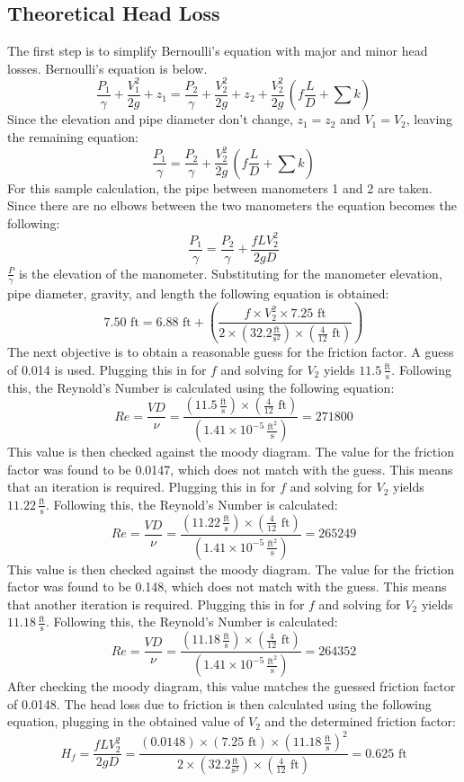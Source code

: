 \documentclass{article}
\begin{document}
\subsection{Theoretical Head Loss}
\noindent The first step is to simplify Bernoulli's equation with major and minor head losses. Bernoulli's equation is below. 
\[\frac{P_1}{\gamma}+\frac{V_1^2}{2g}+z_1=\frac{P_2}{\gamma}+\frac{V_2^2}{2g}+z_2+\frac{V_2^2}{2g}\,\left(f\frac{L}{D}+\sum k \right)\]
Since the elevation and pipe diameter don't change, \(z_1=z_2\) and \(V_1=V_2\), leaving the remaining equation: 
\[\frac{P_1}{\gamma}=\frac{P_2}{\gamma}+\frac{V_2^2}{2g}\,\left(f\frac{L}{D}+\sum k \right)\]
For this sample calculation, the pipe between manometers 1 and 2 are taken. Since there are no elbows between the two manometers the equation becomes the following: 
\[\frac{P_1}{\gamma}=\frac{P_2}{\gamma}+\frac{fLV_2^2}{2gD}\]
\(\frac{P}{\gamma}\) is the elevation of the manometer. Substituting for the manometer elevation, pipe diameter, gravity, and length the following equation is obtained: 
\[7.50\text{ ft}=6.88\text{ ft}+\left(\frac{f\times V_2^2\times7.25\text{ ft}}{2\times \left(32.2 \frac{\text{ft}}{\text{s}^2}\right)\times \left(\frac{4}{12}\text{ ft}\right)}\right)\]
The next objective is to obtain a reasonable guess for the friction factor. A guess of 0.014 is used. Plugging this in for $f$ and solving for $V_2$ yields $11.5\,\frac{\text{ft}}{\text{s}}$. Following this, the Reynold's Number is calculated using the following equation: 
\[Re=\frac{VD}{\nu}=\frac{\left(11.5\,\frac{\text{ft}}{\text{s}}\right)\times \left(\frac{4}{12}\text{ ft}\right)}{\left(1.41\times10^{-5}\,\frac{\text{ft}^2}{\text{s}}\right)}=271800\]
This value is then checked against the moody diagram. The value for the friction factor was found to be 0.0147, which does not match with the guess. This means that an iteration is required. Plugging this in for $f$ and solving for $V_2$ yields $11.22\,\frac{\text{ft}}{\text{s}}$. Following this, the Reynold's Number is calculated: 
\[Re=\frac{VD}{\nu}=\frac{\left(11.22\,\frac{\text{ft}}{\text{s}}\right)\times \left(\frac{4}{12}\text{ ft}\right)}{\left(1.41\times10^{-5}\,\frac{\text{ft}^2}{\text{s}}\right)}=265249\]
This value is then checked against the moody diagram. The value for the friction factor was found to be 0.148, which does not match with the guess. This means that another iteration is required. Plugging this in for $f$ and solving for $V_2$ yields $11.18\,\frac{\text{ft}}{\text{s}}$. Following this, the Reynold's Number is calculated: 
\[Re=\frac{VD}{\nu}=\frac{\left(11.18\,\frac{\text{ft}}{\text{s}}\right)\times \left(\frac{4}{12}\text{ ft}\right)}{\left(1.41\times10^{-5}\,\frac{\text{ft}^2}{\text{s}}\right)}=264352\]
After checking the moody diagram, this value matches the guessed friction factor of 0.0148. The head loss due to friction is then calculated using the following equation, plugging in the obtained value of $V_2$ and the determined friction factor: 
\[H_f=\frac{fLV_2^2}{2gD}=\frac{(0.0148)\times(7.25\text{ ft})\times\left(11.18\,\frac{\text{ft}}{\text{s}}\right)^2}{2\times \left(32.2 \frac{\text{ft}}{\text{s}^2}\right)\times \left(\frac{4}{12}\text{ ft}\right)}=\boxed{0.625 \text{ ft}}\]
\end{document}
